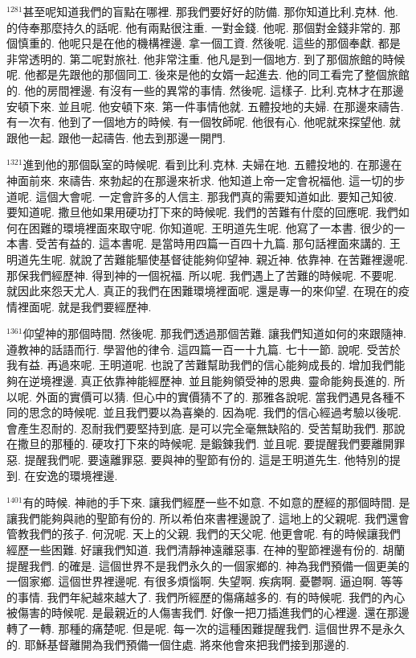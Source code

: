 \documentclass{book}
\begin{document}
$^{1281}$甚至呢知道我們的盲點在哪裡.
那我們要好好的防備.
那你知道比利.克林.
他.
的侍奉那麼持久的話呢.
他有兩點很注重.
一對金錢.
他呢.
那個對金錢非常的.
那個慎重的.
他呢只是在他的機構裡邊.
拿一個工資.
然後呢.
這些的那個奉獻.
都是非常透明的.
第二呢對旅社.
他非常注重.
他凡是到一個地方.
到了那個旅館的時候呢.
他都是先跟他的那個同工.
後來是他的女婿一起進去.
他的同工看完了整個旅館的.
他的房間裡邊.
有沒有一些的異常的事情.
然後呢.
這樣子.
比利.克林才在那邊安頓下來.
並且呢.
他安頓下來.
第一件事情他就.
五體投地的夫婦.
在那邊來禱告.
有一次有.
他到了一個地方的時候.
有一個牧師呢.
他很有心.
他呢就來探望他.
就跟他一起.
跟他一起禱告.
他去到那邊一開門.

$^{1321}$進到他的那個臥室的時候呢.
看到比利.克林.
夫婦在地.
五體投地的.
在那邊在神面前來.
來禱告.
來勃起的在那邊來祈求.
他知道上帝一定會祝福他.
這一切的步道呢.
這個大會呢.
一定會許多的人信主.
那我們真的需要知道如此.
要知己知彼.
要知道呢.
撒旦他如果用硬功打下來的時候呢.
我們的苦難有什麼的回應呢.
我們如何在困難的環境裡面來取守呢.
你知道呢.
王明道先生呢.
他寫了一本書.
很少的一本書.
受苦有益的.
這本書呢.
是當時用四篇一百四十九篇.
那句話裡面來講的.
王明道先生呢.
就說了苦難能驅使基督徒能夠仰望神.
親近神.
依靠神.
在苦難裡邊呢.
那保我們經歷神.
得到神的一個祝福.
所以呢.
我們遇上了苦難的時候呢.
不要呢.
就因此來怨天尤人.
真正的我們在困難環境裡面呢.
還是專一的來仰望.
在現在的疫情裡面呢.
就是我們要經歷神.

$^{1361}$仰望神的那個時間.
然後呢.
那我們透過那個苦難.
讓我們知道如何的來跟隨神.
遵教神的話語而行.
學習他的律令.
這四篇一百一十九篇.
七十一節.
說呢.
受苦於我有益.
再過來呢.
王明道呢.
也說了苦難幫助我們的信心能夠成長的.
增加我們能夠在逆境裡邊.
真正依靠神能經歷神.
並且能夠領受神的恩典.
靈命能夠長進的.
所以呢.
外面的實價可以猜.
但心中的實價猜不了的.
那雅各說呢.
當我們遇見各種不同的思念的時候呢.
並且我們要以為喜樂的.
因為呢.
我們的信心經過考驗以後呢.
會產生忍耐的.
忍耐我們要堅持到底.
是可以完全毫無缺陷的.
受苦幫助我們.
那說在撒旦的那種的.
硬攻打下來的時候呢.
是鍛鍊我們.
並且呢.
要提醒我們要離開罪惡.
提醒我們呢.
要遠離罪惡.
要與神的聖節有份的.
這是王明道先生.
他特別的提到.
在安逸的環境裡邊.

$^{1401}$有的時候.
神祂的手下來.
讓我們經歷一些不如意.
不如意的歷經的那個時間.
是讓我們能夠與祂的聖節有份的.
所以希伯來書裡邊說了.
這地上的父親呢.
我們還會管教我們的孩子.
何況呢.
天上的父親.
我們的天父呢.
他更會呢.
有的時候讓我們經歷一些困難.
好讓我們知道.
我們清靜神遠離惡事.
在神的聖節裡邊有份的.
胡蘭提醒我們.
的確是.
這個世界不是我們永久的一個家鄉的.
神為我們預備一個更美的一個家鄉.
這個世界裡邊呢.
有很多煩惱啊.
失望啊.
疾病啊.
憂鬱啊.
逼迫啊.
等等的事情.
我們年紀越來越大了.
我們所經歷的傷痛越多的.
有的時候呢.
我們的內心被傷害的時候呢.
是最親近的人傷害我們.
好像一把刀插進我們的心裡邊.
還在那邊轉了一轉.
那種的痛楚呢.
但是呢.
每一次的這種困難提醒我們.
這個世界不是永久的.
耶穌基督離開為我們預備一個住處.
將來他會來把我們接到那邊的.
\end{document}
